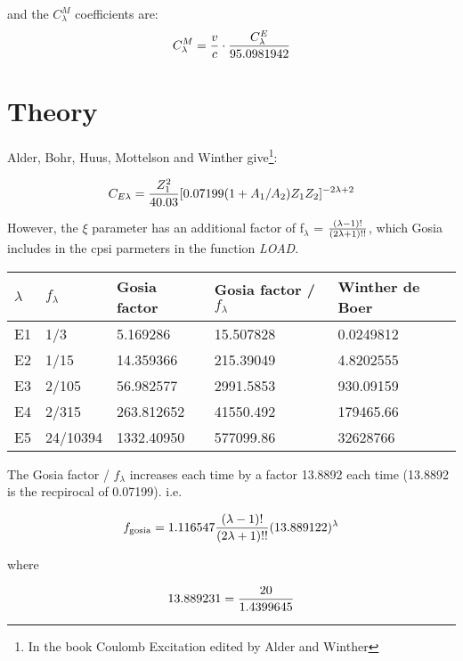 and the $C_\lambda^{M}$ coefficients are:\\

\begin{equation}
C_\lambda^M = {v \over c} \cdot {C_\lambda^E \over 95.0981942}
\end{equation}

\section{Theory}

Alder, Bohr, Huus, Mottelson and Winther give\footnote{In the book Coulomb
Excitation edited by Alder and Winther}:

\begin{equation}
C_{E\lambda} = { Z_1^2 \over 40.03} [0.07199(1+A_1/A_2) Z_1 Z_2]^{-2\lambda+2}
\end{equation}

However, the $\xi$ parameter has an additional factor of f$_\lambda$ = ${(\lambda - 1)!
\over (2 \lambda + 1)!!}$, which Gosia includes in the cpsi parmeters in the
function {\em LOAD}.\\

\begin{tabular}{l|l|l|l|l}
\hline
$\lambda$ & $f_\lambda$ & Gosia factor & Gosia
factor /  $f_\lambda$ & Winther de Boer\\
\hline
E1 & 1/3   & 5.169286   & 15.507828 & 0.0249812\\
E2 & 1/15  & 14.359366  & 215.39049 & 4.8202555\\
E3 & 2/105 & 56.982577  & 2991.5853 & 930.09159\\
E4 & 2/315 & 263.812652 & 41550.492 & 179465.66\\
E5 & 24/10394 & 1332.40950 & 577099.86 & 32628766\\
\end{tabular}

The Gosia factor / $f_\lambda$ increases each time by a factor 13.8892 each
time (13.8892 is the recpirocal of 0.07199). i.e.

\begin{equation}
f_{\mathrm{gosia}} = 1.116547
{(\lambda - 1)! \over (2 \lambda + 1)!!}
(13.889122)^{\lambda}
\end{equation}

where 

\begin{equation}
13.889231 = {20 \over 1.4399645}
\end{equation}

